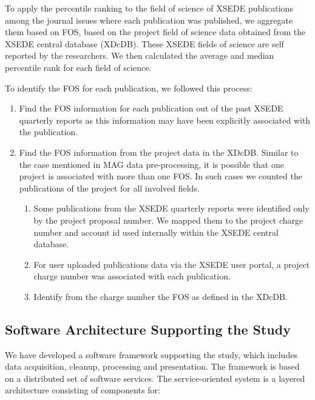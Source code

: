 \documentclass{sig-alternate}
\begin{document}
To apply the percentile ranking to the field of science of XSEDE
publications among the journal issues where each publication was
published, we aggregate them based on FOS, based on the project field
of science data obtained from the XSEDE central database
(XDcDB). These XSEDE fields of science are self reported by the
researchers. We then calculated the average and median percentile rank
for each field of science.

To identify the FOS for each publication, we followed this process:

\begin{enumerate}

\item Find the FOS information for each publication out of the past
  XSEDE quarterly reports as this information may have been explicitly
  associated with the publication.

\item Find the FOS information from the project data in the
  XDcDB. Similar to the case mentioned in MAG data pre-processing, it
  is possible that one project is associated with more than one
  FOS. In such cases we counted the publications of the project for
  all involved fields.

\begin{enumerate}

\item Some publications from the XSEDE quarterly reports were
  identified only by the project proposal number. We mapped them to
  the project charge number and account id used internally within the
  XSEDE central database.

\item For user uploaded publications data via the XSEDE user portal, a
  project charge number was associated with each publication.

\item Identify from the charge number the FOS as defined in the XDcDB.

\end{enumerate}

\end{enumerate}

\subsection{Software Architecture Supporting the Study}

We have developed a software framework supporting the study, which
includes data acquisition, cleanup, processing and presentation. The
framework is based on a distributed set of software services. The
service-oriented system is a layered architecture consisting of
components for:
\end{document}
